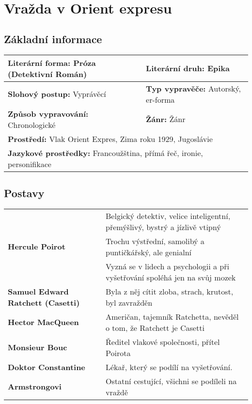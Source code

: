 \section{Vražda v Orient expresu}
\label{sec:orientexpres}
\subsection*{Základní informace}
\begin{tabularx}{\linewidth}{l|l}
    \textbf{Literární forma:} Próza (Detektivní Román) & \textbf{Literární druh:} Epika               \\
    \hline
    \textbf{Slohový postup:} Vyprávěcí                 & \textbf{Typ vypravěče:} Autorský, er-forma   \\
    \hline
    \textbf{Způsob vypravování:} Chronologické         & \textbf{Žánr:} Žánr                          \\
    \hline
    \multicolumn{2}{l}{\textbf{Prostředí:} Vlak Orient Expres, Zima roku 1929, Jugoslávie}            \\
    \hline
    \multicolumn{2}{l}{\textbf{Jazykové prostředky:} Francoužština, přímá řeč, ironie, personifikace} \\
\end{tabularx}
\subsection*{Postavy}
\begin{tabularx}{\linewidth}{l|l}
    \multirow{3}{15em}{\textbf{Hercule Poirot}} & Belgický detektiv, velice inteligentní, přemýšlivý, bystrý a jízlivě vtipný \\
                                                & Trochu výstřední, samolibý a puntičkářský, ale genialní                     \\
                                                & Vyzná se v lidech a psychologii a při vyšetřování spoléhá jen na svůj mozek \\
    \hline
    \textbf{Samuel Edward Ratchett (Casetti)}   & Byla z něj cítit zloba, strach, krutost, byl zavražděn                      \\
    \hline
    \textbf{Hector MacQueen}                    & Američan, tajemník Ratchetta, nevěděl o tom, že Ratchett je Casetti         \\
    \hline
    \textbf{Monsieur Bouc}                      & Ředitel vlakové společnosti, přítel Poirota                                 \\
    \hline
    \textbf{Doktor Constantine}                 & Lékař, který se podílí na vyšetřování.                                      \\
    \hline
    \textbf{Armstrongovi}                       & Ostatní cestující, všichni se podíleli na vraždě                            \\ 
\end{tabularx}
